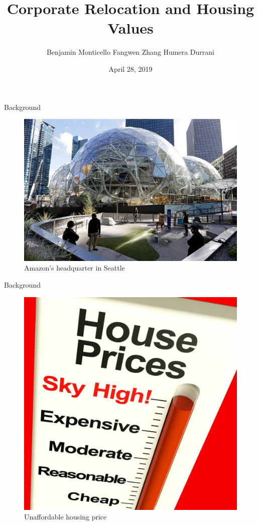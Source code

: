 \documentclass[ignorenonframetext,]{beamer}
\title{Corporate Relocation and Housing Values}
\author{Benjamin Monticello \textbar{} Fangwen Zhang \textbar{} Humera Durrani}
\date{April 28, 2019}
\begin{document}
\frame{\titlepage}

\begin{frame}{Background}

\begin{figure}
\centering
\includegraphics{picture/amazon.jpg}
\caption{Amazon's headquarter in Seattle}
\end{figure}

\end{frame}

\begin{frame}{Background}

\begin{figure}
\centering
\includegraphics{picture/House_price.jpg}
\caption{Unaffordable housing price}
\end{figure}

\end{frame}
\end{document}
